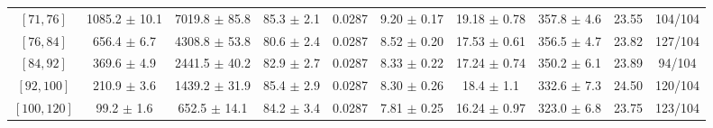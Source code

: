 \begin{tabular}{c||c|c|c|c|c|c|c||c|c}
$[71, 76]$ & 1085.2 $\pm$ 10.1 & 7019.8 $\pm$ 85.8 & 85.3 $\pm$ 2.1 & 0.0287 & 9.20 $\pm$ 0.17 & 19.18 $\pm$ 0.78 & 357.8 $\pm$ 4.6 & 23.55 & 104/104\\
$[76, 84]$ & 656.4 $\pm$ 6.7 & 4308.8 $\pm$ 53.8 & 80.6 $\pm$ 2.4 & 0.0287 & 8.52 $\pm$ 0.20 & 17.53 $\pm$ 0.61 & 356.5 $\pm$ 4.7 & 23.82 & 127/104\\
$[84, 92]$ & 369.6 $\pm$ 4.9 & 2441.5 $\pm$ 40.2 & 82.9 $\pm$ 2.7 & 0.0287 & 8.33 $\pm$ 0.22 & 17.24 $\pm$ 0.74 & 350.2 $\pm$ 6.1 & 23.89 & 94/104\\
$[92, 100]$ & 210.9 $\pm$ 3.6 & 1439.2 $\pm$ 31.9 & 85.4 $\pm$ 2.9 & 0.0287 & 8.30 $\pm$ 0.26 & 18.4 $\pm$ 1.1 & 332.6 $\pm$ 7.3 & 24.50 & 120/104\\
$[100, 120]$ & 99.2 $\pm$ 1.6 & 652.5 $\pm$ 14.1 & 84.2 $\pm$ 3.4 & 0.0287 & 7.81 $\pm$ 0.25 & 16.24 $\pm$ 0.97 & 323.0 $\pm$ 6.8 & 23.75 & 123/104\\
\end{tabular}
